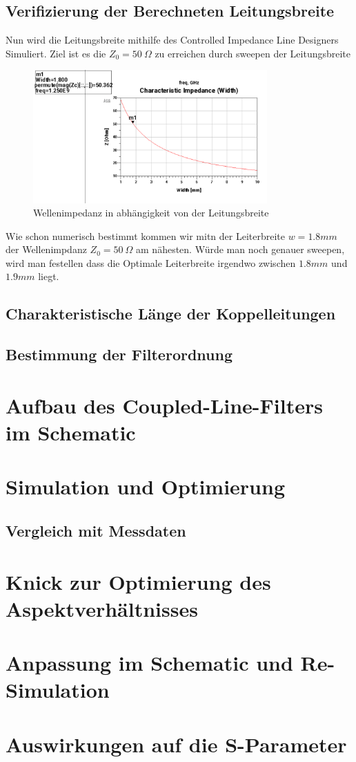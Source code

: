        

    \subsection{Verifizierung der Berechneten Leitungsbreite}
    Nun wird die Leitungsbreite mithilfe des Controlled Impedance Line Designers Simuliert.
    Ziel ist es die $Z_0 = 50~\Omega$ zu erreichen durch sweepen der Leitungsbreite
    \begin{figure}[H]
        \centering
        \includegraphics[width=0.8\textwidth]{Pictures/LeitungsbreitenSweep.png}
        \caption{Wellenimpedanz in abhängigkeit von der Leitungsbreite}
    \end{figure}
    Wie schon numerisch bestimmt kommen wir mitn der Leiterbreite $w=1.8mm$ der Wellenimpdanz $Z_0 = 50~\Omega$
    am nähesten. Würde man noch genauer sweepen, wird man festellen dass die Optimale Leiterbreite irgendwo zwischen
    $1.8mm$ und $1.9mm$ liegt.

    \subsection{Charakteristische Länge der Koppelleitungen}
    \subsection{Bestimmung der Filterordnung}

\section{Aufbau des Coupled-Line-Filters im Schematic}

\section{Simulation und Optimierung}
    \subsection{Vergleich mit Messdaten}

\section{Knick zur Optimierung des Aspektverhältnisses}

\section{Anpassung im Schematic und Re-Simulation}

\section{Auswirkungen auf die S-Parameter}
